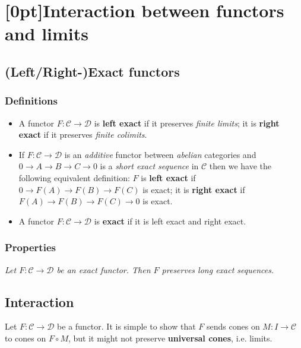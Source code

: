 \documentclass[10pt]{article}
\newcommand{\ccat}{\mathcal{C}}
\newcommand{\dcat}{\mathcal{D}}
\newcommand{\CT}{\textcolor{orange}{CT}}
\newcommand{\HA}{\textcolor{cyan}{HA}}
\begin{document}
    \section{\protect\marginnote{\CT~\HA}[0pt]Interaction between functors and limits}

        \subsection{(Left/Right-)Exact functors}

            \subsubsection{Definitions}

                \begin{itemize}
                    \item A functor $F\colon\ccat\to\dcat$ is \textbf{left exact} if it preserves \emph{finite limits}; it is \textbf{right exact} if it preserves \emph{finite colimits}.
                    \item If $F\colon\ccat\to\dcat$ is an \emph{additive} functor between \emph{abelian} categories and $0\to A\to B\to C\to 0$ is a \emph{short exact sequence} in $\ccat$ then we have the following equivalent definition: $F$ is \textbf{left exact} if $0\to F(A)\to F(B)\to F(C)$ is exact; it is \textbf{right exact} if $F(A)\to F(B)\to F(C)\to 0$ is exact.
                    \item A functor $F\colon\ccat\to\dcat$ is \textbf{exact} if it is left exact and right exact.
                \end{itemize}

            \subsubsection{Properties}

                \emph{Let $F\colon\ccat\to\dcat$ be an exact functor. Then $F$ preserves long exact sequences.}


        \subsection{Interaction}

            Let $F\colon\ccat\to\dcat$ be a functor.
            It is simple to show that $F$ sends cones on $M\colon I\to\ccat$ to cones on $F\circ M$, but it might not preserve \textbf{universal cones}, i.e. limits.
\end{document}
